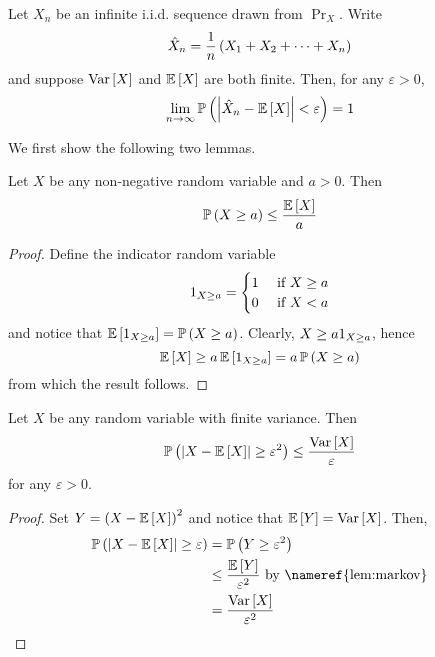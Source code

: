 \begin{theorem}
    \label{thm:wlln}
    Let $X_n$ be an infinite i.i.d. sequence drawn from $\Pr_X$. Write
    \[\hat{X}_n = \frac{1}{n}\left(X_1 + X_2 + \dots + X_n\right)\]
    and suppose $\operatorname{\operatorname{Var}}\left[X\right]$ and $\expectation{X}$ are both finite. Then, for
    any $\varepsilon > 0$,
    \[\lim_{n\to\infty}\prob{\abs{\sampleavg{X}_n - \expectation{X}} < \varepsilon} = 1\]
\end{theorem}

We first show the following two lemmas.

\begin{lemma}
    \label{lem:markov}
    Let $X$ be any non-negative random variable and $a > 0$. Then
    \[\prob{X \geq a} \leq \frac{\expectation{X}}{a}\]
\end{lemma}

\begin{proof}
    Define the indicator random variable
    \[1_{X \geq a} = \begin{cases}1 & \hbox{ if $X \geq a$}\\0 & \hbox{ if $X < a$}\end{cases}\]
    and notice that $\expectation{\indicator{X \geq a}} = \prob{X \geq a}$. Clearly,
    $X \geq a1_{X \geq a}$, hence
    \[\expectation{X} \geq a\expectation{\indicator{X \geq a}} = a\prob{X \geq a}\]
    from which the result follows.
\end{proof}

\begin{lemma}
    \label{lem:chebyshev}
    Let $X$ be any random variable with finite variance. Then
    \[\prob{\abs{X - \expectation{X}} \geq \varepsilon^2} \leq \frac{\variance{X}}{\varepsilon}\]
    for any $\varepsilon > 0$.
\end{lemma}

\begin{proof}
    Set $Y = \left(X - \expectation{X}\right)^2$ and notice that
    $\expectation{Y} = \variance{X}$. Then,
    \begin{align*}\prob{\abs{X - \expectation{X}} \geq \varepsilon}
         & = \prob{Y \geq \varepsilon^2}                                             \\
         & \leq \frac{\expectation{Y}}{\varepsilon^2}\hbox{ by \nameref{lem:markov}} \\
         & = \frac{\variance{X}}{\varepsilon^2}\qedhere
    \end{align*}
\end{proof}

